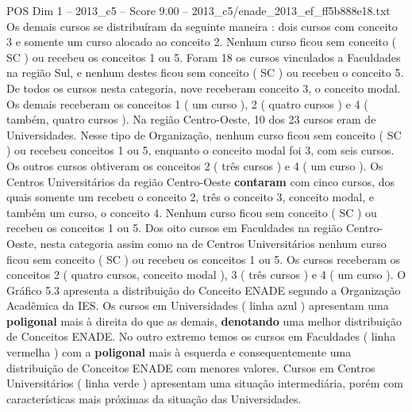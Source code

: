 \begin{textsample}{POS Dim 1 – 2013\_c5 – Score 9.00 – 2013\_c5/enade\_2013\_ef\_ff5b888e18.txt}
Os demais cursos se distribuíram da seguinte maneira : dois cursos com conceito 3 e somente um curso alocado ao conceito 2.
Nenhum curso ficou sem conceito ( SC ) ou recebeu os conceitos 1 ou 5.
Foram 18 os cursos vinculados a Faculdades na região Sul, e nenhum destes ficou sem conceito ( SC ) ou recebeu o conceito 5.
De todos os cursos nesta categoria, nove receberam conceito 3, o conceito modal.
Os demais receberam os conceitos 1 ( um curso ), 2 ( quatro cursos ) e 4 ( também, quatro cursos ).
Na região Centro-Oeste, 10 dos 23 cursos eram de Universidades.
Nesse tipo de Organização, nenhum curso ficou sem conceito ( SC ) ou recebeu conceitos 1 ou 5, enquanto o conceito modal foi 3, com seis cursos.
Os outros cursos obtiveram os conceitos 2 ( três cursos ) e 4 ( um curso ).
Os Centros Universitários da região Centro-Oeste \textbf{contaram} com cinco cursos, dos quais somente um recebeu o conceito 2, três o conceito 3, conceito modal, e também um curso, o conceito 4.
Nenhum curso ficou sem conceito ( SC ) ou recebeu os conceitos 1 ou 5.
Dos oito cursos em Faculdades na região Centro-Oeste, nesta categoria assim como na de Centros Universitários nenhum curso ficou sem conceito ( SC ) ou recebeu os conceitos 1 ou 5.
Os cursos receberam os conceitos 2 ( quatro cursos, conceito modal ), 3 ( três cursos ) e 4 ( um curso ).
O Gráfico 5.3 apresenta a distribuição do Conceito ENADE segundo a Organização Acadêmica da IES.
Os cursos em Universidades ( linha azul ) apresentam uma \textbf{poligonal} mais à direita do que as demais, \textbf{denotando} uma melhor distribuição de Conceitos ENADE.
No outro extremo temos os cursos em Faculdades ( linha vermelha ) com a \textbf{poligonal} mais à esquerda e consequentemente uma distribuição de Conceitos ENADE com menores valores.
Cursos em Centros Universitários ( linha verde ) apresentam uma situação intermediária, porém com características mais próximas da situação das Universidades.

\end{textsample}
